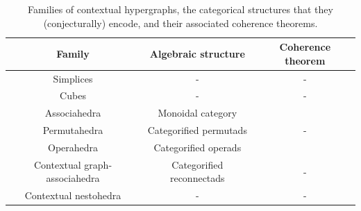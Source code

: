 \begin{table}[h!]
	\begin{center}
	\begin{tabular}{c|c|c}
	Family & Algebraic structure & Coherence theorem \\
	\hline
	Simplices & - & - \\
	Cubes & - & - \\
	Associahedra & Monoidal category & \cite{MacLane63} \\
	Permutahedra & Categorified permutads & - \\
	Operahedra & Categorified operads & \cite{DP15,CLA1} \\
	Contextual graph-associahedra & Categorified reconnectads & - \\
	Contextual nestohedra & - & - 
	\end{tabular}
	\end{center}
  \caption{Families of contextual hypergraphs, the categorical structures that they (conjecturally) encode, and their associated coherence theorems.}
  \label{table:contextual-hyper}
\end{table}






